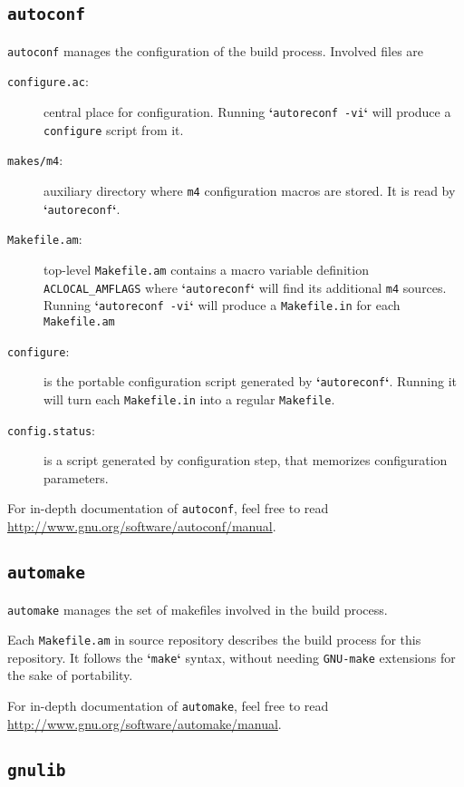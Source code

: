 \documentclass[a4paper]{article}
\newcommand{\autoconf}{\texttt{autoconf}}
\newcommand{\automake}{\texttt{automake}}
\newcommand{\gnulib}{\texttt{gnulib}}
\newcommand{\file}[1]{\texttt{#1}}
\newcommand{\dir}[1]{\texttt{#1}}
\newcommand{\cmd}[1]{\textbf{`}\texttt{#1}\textbf{`}}
\begin{document}
\subsection{\autoconf{}}

\autoconf{} manages the configuration of the build process.
Involved files are
\begin{description}
\item[\file{configure.ac}:] central place for configuration. Running \cmd{autoreconf -vi} will produce a \file{configure} script from it.
\item[\dir{makes/m4}:] auxiliary directory where \texttt{m4} configuration macros are stored. It is read by \cmd{autoreconf}.
\item[\file{Makefile.am}:] top-level \file{Makefile.am} contains a macro variable definition \texttt{ACLOCAL\_AMFLAGS} where \cmd{autoreconf} will find its additional \texttt{m4} sources.
Running \cmd{autoreconf -vi} will produce a \file{Makefile.in} for each \file{Makefile.am}
\item[\file{configure}:] is the portable configuration script generated by \cmd{autoreconf}. Running it will turn each \file{Makefile.in} into a regular \file{Makefile}.
\item[\file{config.status}:] is a script generated by configuration step,
  that memorizes configuration parameters.
\end{description}

For in-depth documentation of \autoconf{}, feel free to read \url{http://www.gnu.org/software/autoconf/manual}.

\subsection{\automake{}}

\automake{} manages the set of makefiles involved in the build process.

Each \file{Makefile.am} in source repository describes the build process for this repository.
It follows the \cmd{make} syntax, without needing \texttt{GNU-make} extensions for the sake of portability.

For in-depth documentation of \automake{}, feel free to read \url{http://www.gnu.org/software/automake/manual}.

\subsection{\gnulib{}}
\end{document}

